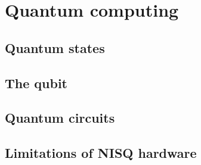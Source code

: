 \chapter{Quantum computing}

\section{Quantum states}

\section{The qubit}

\section{Quantum circuits}

\section{Limitations of NISQ hardware}
